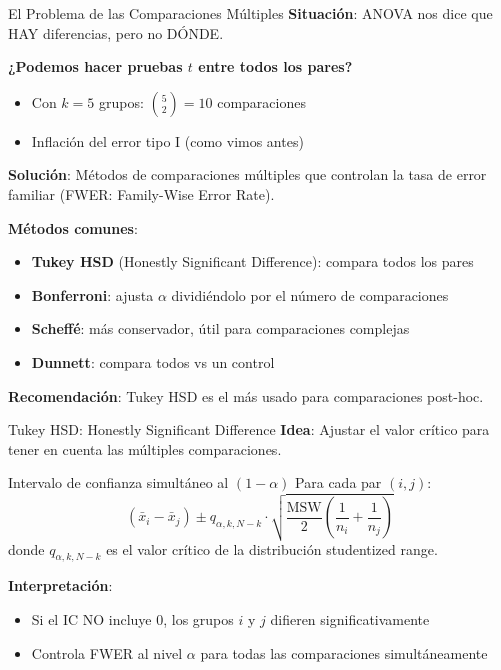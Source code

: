 \documentclass[aspectratio=169, 11pt]{beamer}
\begin{document}
\begin{frame}{El Problema de las Comparaciones Múltiples}
\textbf{Situación}: ANOVA nos dice que HAY diferencias, pero no DÓNDE.

\vspace{0.3cm}
\textbf{¿Podemos hacer pruebas $t$ entre todos los pares?}
\begin{itemize}
  \item Con $k = 5$ grupos: $\binom{5}{2} = 10$ comparaciones
  \item Inflación del error tipo I (como vimos antes)
\end{itemize}

\vspace{0.3cm}
\textbf{Solución}: Métodos de comparaciones múltiples que controlan la \alert{tasa de error familiar} (FWER: Family-Wise Error Rate).

\vspace{0.3cm}
\textbf{Métodos comunes}:
\begin{itemize}
  \item \textbf{Tukey HSD} (Honestly Significant Difference): compara todos los pares
  \item \textbf{Bonferroni}: ajusta $\alpha$ dividiéndolo por el número de comparaciones
  \item \textbf{Scheffé}: más conservador, útil para comparaciones complejas
  \item \textbf{Dunnett}: compara todos vs un control
\end{itemize}

\vspace{0.3cm}
\textbf{Recomendación}: Tukey HSD es el más usado para comparaciones post-hoc.
\end{frame}

\begin{frame}{Tukey HSD: Honestly Significant Difference}
\textbf{Idea}: Ajustar el valor crítico para tener en cuenta las múltiples comparaciones.

\vspace{0.3cm}
\begin{block}{Intervalo de confianza simultáneo al $(1-\alpha)$}
Para cada par $(i, j)$:
\[
(\bar{x}_i - \bar{x}_j) \pm q_{\alpha, k, N-k} \cdot \sqrt{\frac{\text{MSW}}{2} \left(\frac{1}{n_i} + \frac{1}{n_j}\right)}
\]
donde $q_{\alpha, k, N-k}$ es el valor crítico de la distribución \alert{studentized range}.
\end{block}

\vspace{0.3cm}
\textbf{Interpretación}:
\begin{itemize}
  \item Si el IC NO incluye 0, los grupos $i$ y $j$ difieren significativamente
  \item Controla FWER al nivel $\alpha$ para \alert{todas} las comparaciones simultáneamente
\end{itemize}
\end{frame}
\end{document}
